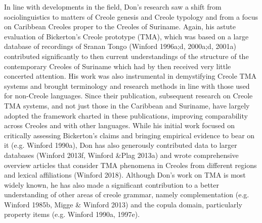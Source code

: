 \documentclass[output=paper, colorlinks,citecolor=brown]{langscibook}
\begin{document}
In line with developments in the field, Don’s research saw a shift from sociolinguistics to matters of Creole genesis and Creole typology and from a focus on Caribbean Creoles proper to the Creoles of Suriname. Again, his astute evaluation of Bickerton’s Creole prototype (TMA), which was based on a large database of recordings of Sranan Tongo (Winford 1996a;d, 2000a;d, 2001a) contributed significantly to then current understandings of the structure of the contemporary Creoles of Suriname which had by then received very little concerted attention. His work was also instrumental in demystifying Creole TMA systems and brought terminology and research methods in line with those used for non-Creole languages. Since their publication, subsequent research on Creole TMA systems, and not just those in the Caribbean and Suriname, have largely adopted the framework charted in these publications, improving comparability across Creoles and with other languages. While his initial work focused on critically assessing Bickerton’s claims and bringing empirical evidence to bear on it (e.g. Winford 1990a), Don has also generously contributed data to larger databases (Winford 2013f, Winford \&Plag 2013a) and wrote comprehensive overview articles that consider TMA phenomena in Creoles from different regions and lexical affiliations (Winford 2018). Although Don’s work on TMA is most widely known, he has also made a significant contribution to a better understanding of other areas of creole grammar, namely complementation (e.g. Winford 1985b, Migge \& Winford 2013) and the copula domain, particularly property items (e.g. Winford 1990a, 1997e). 
\end{document}
